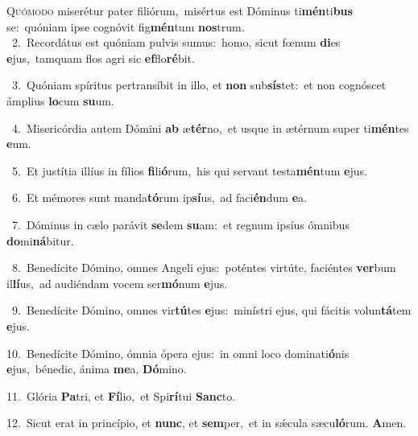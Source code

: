 \lettrine{\initial\textcolor{\initialcolor}{Q}}{uómodo} miserétur pater filiórum,~\dagger misértus est Dóminus ti\-\textbf{mén}\-ti\textbf{bus} se:~\star quóniam ipse cognóvit fig\-\textbf{mén}\-tum \textbf{nos}\-trum.\\
{\numbfont\textcolor{\numbcolor}{~2.}}~Recordátus est quóniam pulvis sumus:~\dagger homo, sicut fœnum \textbf{di}\-es \textbf{e}\-jus,~\star tamquam flos agri sic \textbf{ef}\-flo\-\textbf{ré}\-bit.\par
{\numbfont\textcolor{\numbcolor}{~3.}}~Quóniam spíritus pertransíbit in illo, et \textbf{non} sub\-\textbf{sís}\-tet:~\star et non cognóscet ámplius \textbf{lo}\-cum \textbf{su}\-um.\par
{\numbfont\textcolor{\numbcolor}{~4.}}~Misericórdia autem Dómini \textbf{ab} æ\-\textbf{tér}\-no,~\star et usque in ætérnum super ti\-\textbf{mén}\-tes \textbf{e}\-um.\par
{\numbfont\textcolor{\numbcolor}{~5.}}~Et justítia illíus in fílios \textbf{fi}\-li\-\textbf{ó}\-rum,~\star his qui servant testa\-\textbf{mén}\-tum \textbf{e}\-jus.\par
{\numbfont\textcolor{\numbcolor}{~6.}}~Et mémores sunt manda\-\textbf{tó}\-rum ip\-\textbf{sí}\-us,~\star ad faci\-\textbf{én}\-dum \textbf{e}\-a.\par
{\numbfont\textcolor{\numbcolor}{~7.}}~Dóminus in cælo parávit \textbf{se}\-dem \textbf{su}\-am:~\star et regnum ipsíus ómnibus \textbf{do}\-mi\-\textbf{ná}\-bitur.\par
{\numbfont\textcolor{\numbcolor}{~8.}}~Benedícite Dómino, omnes Angeli ejus:~\dagger poténtes virtúte, faciéntes \textbf{ver}\-bum il\-\textbf{lí}\-us,~\star ad audiéndam vocem ser\-\textbf{mó}\-num \textbf{e}\-jus.\par
{\numbfont\textcolor{\numbcolor}{~9.}}~Benedícite Dómino, omnes vir\-\textbf{tú}\-tes \textbf{e}\-jus:~\star minístri ejus, qui fácitis volun\-\textbf{tá}\-tem \textbf{e}\-jus.\par
{\numbfont\textcolor{\numbcolor}{10.}}~Benedícite Dómino, ómnia ópera ejus:~\dagger in omni loco dominati\-\textbf{ó}\-nis \textbf{e}\-jus,~\star bénedic, ánima \textbf{me}\-a, \textbf{Dó}\-mino.\par
{\numbfont\textcolor{\numbcolor}{11.}}~Glória \textbf{Pa}\-tri, et \textbf{Fí}\-lio,~\star et Spi\-\textbf{rí}\-tui \textbf{Sanc}\-to.\par
{\numbfont\textcolor{\numbcolor}{12.}}~Sicut erat in princípio, et \textbf{nunc}\-, et \textbf{sem}\-per,~\star et in sǽcula sæcu\-\textbf{ló}\-rum. \textbf{A}\-men.\par
